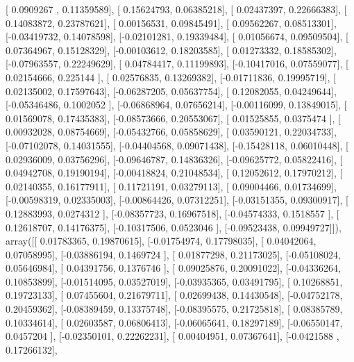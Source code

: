 \documentclass{article}
\begin{document}
       [ 0.0909267 ,  0.11359589],
       [ 0.15624793,  0.06385218],
       [ 0.02437397,  0.22666383],
       [ 0.14083872,  0.23787621],
       [ 0.00156531,  0.09845491],
       [ 0.09562267,  0.08513301],
       [-0.03419732,  0.14078598],
       [-0.02101281,  0.19339484],
       [ 0.01056674,  0.09509504],
       [ 0.07364967,  0.15128329],
       [-0.00103612,  0.18203585],
       [ 0.01273332,  0.18585302],
       [-0.07963557,  0.22249629],
       [ 0.04784417,  0.11199893],
       [-0.10417016,  0.07559077],
       [ 0.02154666,  0.225144  ],
       [ 0.02576835,  0.13269382],
       [-0.01711836,  0.19995719],
       [ 0.02135002,  0.17597643],
       [-0.06287205,  0.05637754],
       [ 0.12082055,  0.04249644],
       [-0.05346486,  0.1002052 ],
       [-0.06868964,  0.07656214],
       [-0.00116099,  0.13849015],
       [ 0.01569078,  0.17435383],
       [-0.08573666,  0.20553067],
       [ 0.01525855,  0.0375474 ],
       [ 0.00932028,  0.08754669],
       [-0.05432766,  0.05858629],
       [ 0.03590121,  0.22034733],
       [-0.07102078,  0.14031555],
       [-0.04404568,  0.09071438],
       [-0.15428118,  0.06010448],
       [ 0.02936009,  0.03756296],
       [-0.09646787,  0.14836326],
       [-0.09625772,  0.05822416],
       [ 0.04942708,  0.19190194],
       [-0.00418824,  0.21048534],
       [ 0.12052612,  0.17970212],
       [ 0.02140355,  0.16177911],
       [ 0.11721191,  0.03279113],
       [ 0.09004466,  0.01734699],
       [-0.00598319,  0.02335003],
       [-0.00864426,  0.07312251],
       [-0.03151355,  0.09300917],
       [ 0.12883993,  0.0274312 ],
       [-0.08357723,  0.16967518],
       [-0.04574333,  0.1518557 ],
       [ 0.12618707,  0.14176375],
       [-0.10317506,  0.0523046 ],
       [-0.09523438,  0.09949727]]), array([[ 0.01783365,  0.19870615],
       [-0.01754974,  0.17798035],
       [ 0.04042064,  0.07058995],
       [-0.03886194,  0.1469724 ],
       [ 0.01877298,  0.21173025],
       [-0.05108024,  0.05646984],
       [ 0.04391756,  0.1376746 ],
       [ 0.09025876,  0.20091022],
       [-0.04336264,  0.10853899],
       [-0.01514095,  0.03527019],
       [-0.03935365,  0.03491795],
       [ 0.10268851,  0.19723133],
       [ 0.07455604,  0.21679711],
       [ 0.02699438,  0.14430548],
       [-0.04752178,  0.20459362],
       [-0.08389459,  0.13375748],
       [-0.08395575,  0.21725818],
       [ 0.08385789,  0.10334614],
       [ 0.02603587,  0.06806413],
       [-0.06065641,  0.18297189],
       [-0.06550147,  0.0457204 ],
       [-0.02350101,  0.22262231],
       [ 0.00404951,  0.07367641],
       [-0.0421588 ,  0.17266132],
\end{document}
